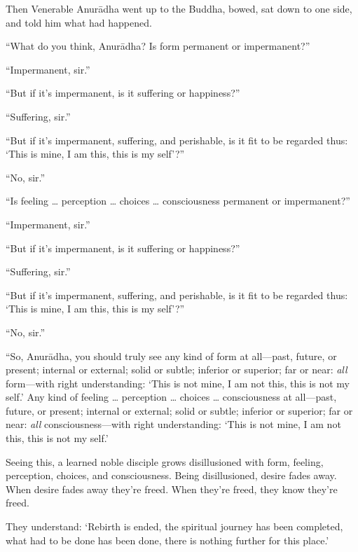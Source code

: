 \documentclass[12pt,openany]{book}%
\begin{document}
Then Venerable \textsanskrit{Anurādha} went up to the Buddha, bowed, sat down to one side, and told him what had happened. 

“What do you think, \textsanskrit{Anurādha}? Is form permanent or impermanent?” 

“Impermanent, sir.” 

“But if it’s impermanent, is it suffering or happiness?” 

“Suffering, sir.” 

“But if it’s impermanent, suffering, and perishable, is it fit to be regarded thus: ‘This is mine, I am this, this is my self’?” 

“No, sir.” 

“Is feeling … perception … choices … consciousness permanent or impermanent?” 

“Impermanent, sir.” 

“But if it’s impermanent, is it suffering or happiness?” 

“Suffering, sir.” 

“But if it’s impermanent, suffering, and perishable, is it fit to be regarded thus: ‘This is mine, I am this, this is my self’?” 

“No, sir.” 

“So, \textsanskrit{Anurādha}, you should truly see any kind of form at all—past, future, or present; internal or external; solid or subtle; inferior or superior; far or near: \emph{all} form—with right understanding: ‘This is not mine, I am not this, this is not my self.’ Any kind of feeling … perception … choices … consciousness at all—past, future, or present; internal or external; solid or subtle; inferior or superior; far or near: \emph{all} consciousness—with right understanding: ‘This is not mine, I am not this, this is not my self.’ 

Seeing this, a learned noble disciple grows disillusioned with form, feeling, perception, choices, and consciousness. Being disillusioned, desire fades away. When desire fades away they’re freed. When they’re freed, they know they’re freed. 

They understand: ‘Rebirth is ended, the spiritual journey has been completed, what had to be done has been done, there is nothing further for this place.’ 
\end{document}
